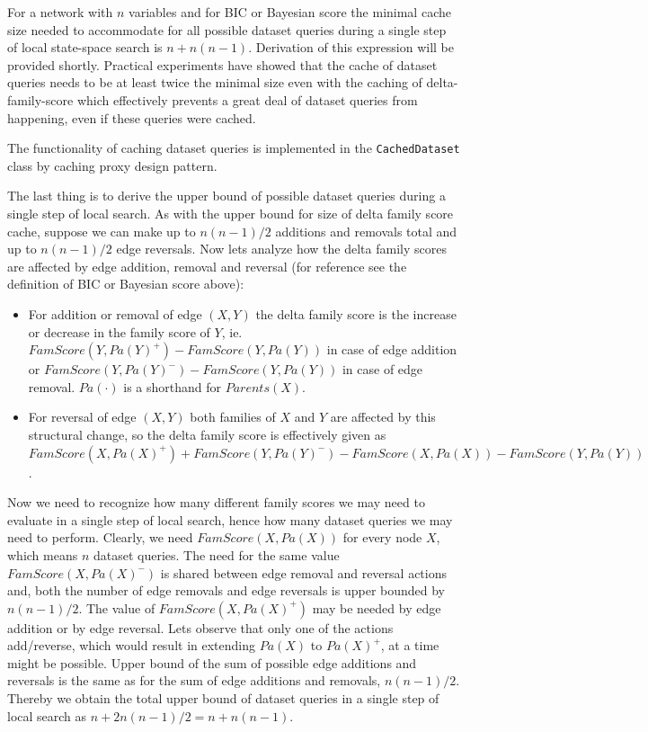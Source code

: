 \documentclass[english,cover]{fitthesis} %
\newcommand{\srccode}[1]{{\tt #1}}         %
\begin{document}
For a network with $n$ variables and for BIC or Bayesian score the minimal cache size needed to accommodate for all possible dataset queries during a single step of local state-space search is $n + n(n-1)$. Derivation of this expression will be provided shortly. Practical experiments have showed that the cache of dataset queries needs to be at least twice the minimal size even with the caching of delta-family-score which effectively prevents a great deal of dataset queries from happening, even if these queries were cached.

The functionality of caching dataset queries is implemented in the \srccode{CachedDataset} class by caching proxy design pattern.

\medskip
The last thing is to derive the upper bound of possible dataset queries during a single step of local search. As with the upper bound for size of delta family score cache, suppose we can make up to $n(n-1)/2$ additions and removals total and up to $n(n-1)/2$ edge reversals. Now lets analyze how the delta family scores are affected by edge addition, removal and reversal (for reference see the definition of BIC or Bayesian score above):
\begin{itemize}
	\item For addition or removal of edge $(X,Y)$ the delta family score is the increase or decrease in the family score of $Y$, ie. $FamScore(Y,Pa(Y)^{+}) - FamScore(Y,Pa(Y))$ in case of edge addition or $FamScore(Y,Pa(Y)^{-}) - FamScore(Y,Pa(Y))$ in case of edge removal. $Pa(\cdot)$ is a shorthand for $Parents(X)$.
	\item For reversal of edge $(X,Y)$ both families of $X$ and $Y$ are affected by this structural change, so the delta family score is effectively given as $FamScore(X,Pa(X)^+) + FamScore(Y,Pa(Y)^-) - FamScore(X,Pa(X)) - FamScore(Y,Pa(Y))$.
\end{itemize}
Now we need to recognize how many different family scores we may need to evaluate in a single step of local search, hence how many dataset queries we may need to perform.
Clearly, we need $FamScore(X,Pa(X))$ for every node $X$, which means $n$ dataset queries.
The need for the same value $FamScore(X,Pa(X)^-)$ is shared between edge removal and reversal actions and, both the number of edge removals and edge reversals is upper bounded by $n(n-1)/2$.
The value of $FamScore(X,Pa(X)^+)$ may be needed by edge addition or by edge reversal. Lets observe that only one of the actions add/reverse, which would result in extending $Pa(X)$ to $Pa(X)^+$, at a time might be possible. Upper bound of the sum of possible edge additions and reversals is the same as for the sum of edge additions and removals, $n(n-1)/2$. Thereby we obtain the total upper bound of dataset queries in a single step of local search as $n + 2n(n-1)/2 = n + n(n-1)$.
\end{document}
